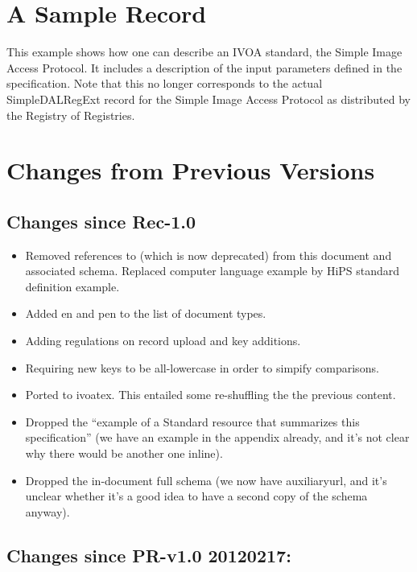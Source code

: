 \documentclass[11pt,a4paper]{ivoa}
\begin{document}
\appendix

\section{A Sample Record}
\label{app:fullrecord}

This example shows how one can describe an IVOA standard, the Simple
Image Access Protocol.  It includes a description of the input parameters
defined in the specification.  Note that this no longer corresponds to
the actual SimpleDALRegExt record for the Simple Image Access Protocol
as distributed by the Registry of Registries.



\section{Changes from Previous Versions}

\subsection{Changes since Rec-1.0}

\begin{itemize}
\item Removed references to  (which is now deprecated)
from this document and associated schema.
Replaced computer language example by HiPS standard definition example.
\item Added en and pen to the list of document types.
\item Adding regulations on record upload and key additions.
\item Requiring new keys to be all-lowercase in order to simpify
comparisons.
\item Ported to ivoatex.  This entailed some re-shuffling the the
previous content.
\item Dropped the ``example of a Standard resource that summarizes this
specification'' (we have an example in the appendix already, and it's
not clear why there would be another one inline).
\item Dropped the in-document full schema (we now have auxiliaryurl, and
it's unclear whether it's a good idea to have a second copy of the
schema anyway).
\end{itemize}

\subsection{Changes since PR-v1.0 20120217:}
\end{document}
